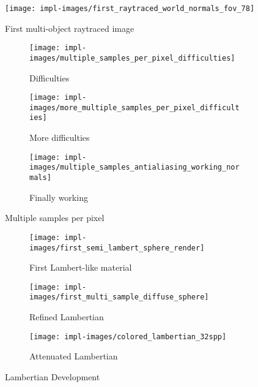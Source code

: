 \vspace{0.3em}
\begin{figure}[htb]
  \centering
  \texttt{[image: impl-images/first\_raytraced\_world\_normals\_fov\_78]}
  \caption{First multi-object raytraced image}
  \label{fig:rayterm-cpu_first_multiobject_raytraced_image}
\end{figure}

\vspace{0.3em}
\begin{figure}[htb]
  \centering
  \begin{subfigure}[htb]{0.3\textwidth}
    \texttt{[image: impl-images/multiple\_samples\_per\_pixel\_difficulties]}
    \caption{Difficulties}
    \label{fig:rayterm-cpu_multisample_problems}
  \end{subfigure}
  \begin{subfigure}[htb]{0.3\textwidth}
    \texttt{[image: impl-images/more\_multiple\_samples\_per\_pixel\_difficulties]}
    \caption{More difficulties}
    \label{fig:rayterm-cpu_multisample_more_problems}
  \end{subfigure}
  \begin{subfigure}[htb]{0.3\textwidth}
    \texttt{[image: impl-images/multiple\_samples\_antialiasing\_working\_normals]}
    \caption{Finally working}
    \label{fig:rayterm-cpu_multisample_working}
  \end{subfigure}
  \caption{Multiple samples per pixel}
  \label{fig:rayterm-cpu_multisampling}
\end{figure}

\vspace{0.3em}
\begin{figure}[htb]
  \centering
  \begin{subfigure}[htb]{0.3\textwidth}
    \texttt{[image: impl-images/first\_semi\_lambert\_sphere\_render]}
    \caption{First Lambert-like material}
    \label{fig:rayterm-cpu_lambert}
  \end{subfigure}
  \begin{subfigure}[htb]{0.3\textwidth}
    \texttt{[image: impl-images/first\_multi\_sample\_diffuse\_sphere]}
    \caption{Refined Lambertian}
    \label{fig:rayterm-cpu_lambert_refined}
  \end{subfigure}
  \begin{subfigure}[htb]{0.3\textwidth}
    \texttt{[image: impl-images/colored\_lambertian\_32spp]}
    \caption{Attenuated Lambertian}
    \label{fig:rayterm-cpu_lambert_colored}
  \end{subfigure}
  \caption{Lambertian Development}
  \label{fig:rayterm-cpu_lambert_development}
\end{figure}

